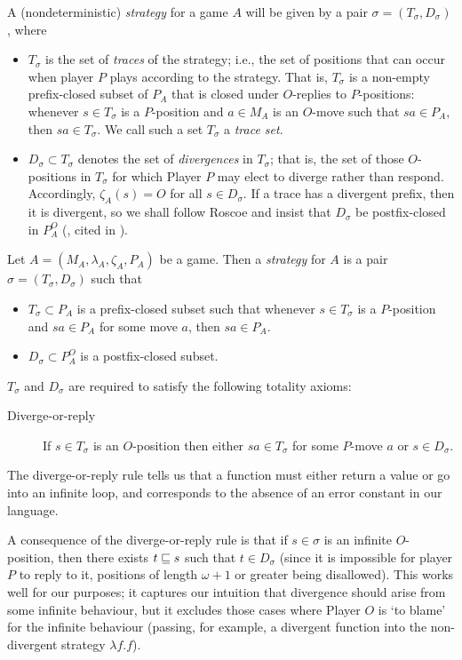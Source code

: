 \documentclass{article}
\begin{document}
A (nondeterministic) \emph{strategy} for a game $A$ will be given by a pair $\sigma=(T_\sigma, D_\sigma)$, where
\begin{itemize}
  \item $T_\sigma$ is the set of \emph{traces} of the strategy; i.e., the set of positions that can occur when player $P$ plays according to the strategy.  That is, $T_\sigma$ is a non-empty prefix-closed subset of $P_A$ that is closed under $O$-replies to $P$-positions: whenever $s\in T_\sigma$ is a $P$-position and $a\in M_A$ is an $O$-move such that $sa\in P_A$, then $sa\in T_\sigma$.  We call such a set $T_\sigma$ a \emph{trace set}.

  \item $D_\sigma\subset T_\sigma$ denotes the set of \emph{divergences} in $T_\sigma$; that is, the set of those $O$-positions in $T_\sigma$ for which Player $P$ may elect to diverge rather than respond.  Accordingly, $\zeta_A(s)=O$ for all $s\in D_\sigma$.  If a trace has a divergent prefix, then it is divergent, so we shall follow Roscoe and insist that $D_\sigma$ be postfix-closed in $P_A^O$ (\cite{RoscoeCspInfinite}, cited in \cite{mcCHFiniteND}).
\end{itemize}

\begin{definition}
  Let $A=(M_A,\lambda_A,\zeta_A,P_A)$ be a game.  Then a \emph{strategy} for $A$ is a pair $\sigma=(T_\sigma,D_\sigma)$ such that
  \begin{itemize}
    \item $T_\sigma\subset P_A$ is a prefix-closed subset such that whenever $s\in T_\sigma$ is a $P$-position and $sa\in P_A$ for some move $a$, then $sa\in P_A$.
    \item $D_\sigma\subset P_A^O$ is a postfix-closed subset.
  \end{itemize}

  $T_\sigma$ and $D_\sigma$ are required to satisfy the following totality axioms:
  \begin{description}
    \item[Diverge-or-reply] If $s\in T_\sigma$ is an $O$-position then either $sa\in T_\sigma$ for some $P$-move $a$ or $s\in D_\sigma$.  
  \end{description}

  The diverge-or-reply rule tells us that a function must either return a value or go into an infinite loop, and corresponds to the absence of an error constant in our language.  

  A consequence of the diverge-or-reply rule is that if $s\in \sigma$ is an infinite $O$-position, then there exists $t\sqsubseteq s$ such that $t\in D_\sigma$ (since it is impossible for player $P$ to reply to it, positions of length $\omega+1$ or greater being disallowed).  This works well for our purposes; it captures our intuition that divergence should arise from some infinite behaviour, but it excludes those cases where Player $O$ is `to blame' for the infinite behaviour (passing, for example, a divergent function into the non-divergent strategy $\lambda f.f$).  
\end{definition}
\end{document}
